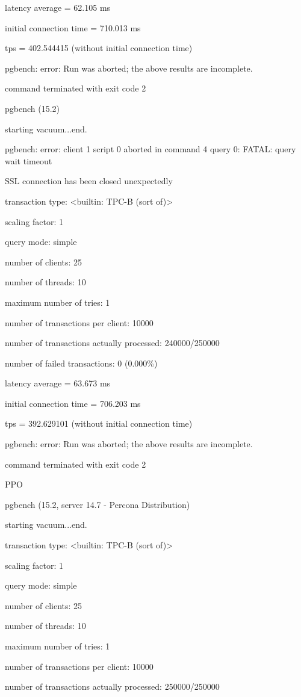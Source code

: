 latency average = 62.105 ms

initial connection time = 710.013 ms

tps = 402.544415 (without initial connection time)

pgbench: error: Run was aborted; the above results are incomplete.

command terminated with exit code 2

pgbench (15.2)

starting vacuum...end.

pgbench: error: client 1 script 0 aborted in command 4 query 0: FATAL:  query wait timeout

SSL connection has been closed unexpectedly

transaction type: <builtin: TPC-B (sort of)>

scaling factor: 1

query mode: simple

number of clients: 25

number of threads: 10

maximum number of tries: 1

number of transactions per client: 10000

number of transactions actually processed: 240000/250000

number of failed transactions: 0 (0.000\%)

latency average = 63.673 ms

initial connection time = 706.203 ms

tps = 392.629101 (without initial connection time)

pgbench: error: Run was aborted; the above results are incomplete.

command terminated with exit code 2

PPO

pgbench (15.2, server 14.7 - Percona Distribution)

starting vacuum...end.

transaction type: <builtin: TPC-B (sort of)>

scaling factor: 1

query mode: simple

number of clients: 25

number of threads: 10

maximum number of tries: 1

number of transactions per client: 10000

number of transactions actually processed: 250000/250000

